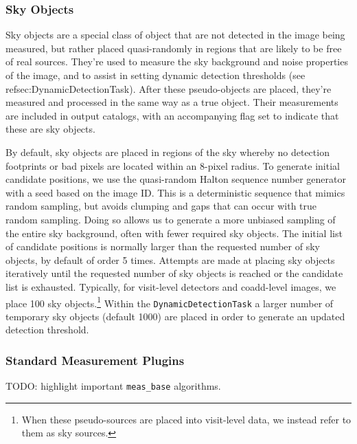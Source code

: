 \subsubsection{Sky Objects}
\label{sec:sky-objects}

Sky objects are a special class of object that are not detected in the image being measured, but rather placed quasi-randomly in regions that are likely to be free of real sources.
They're used to measure the sky background and noise properties of the image, and to assist in setting dynamic detection thresholds (see ref{sec:DynamicDetectionTask}).
After these pseudo-objects are placed, they're measured and processed in the same way as a true object.
Their measurements are included in output catalogs, with an accompanying flag set to indicate that these are sky objects.

By default, sky objects are placed in regions of the sky whereby no detection footprints or bad pixels are located within an 8-pixel radius.
To generate initial candidate positions, we use the quasi-random Halton sequence number generator with a seed based on the image ID.
This is a deterministic sequence that mimics random sampling, but avoids clumping and gaps that can occur with true random sampling.
Doing so allows us to generate a more unbiased sampling of the entire sky background, often with fewer required sky objects.
The initial list of candidate positions is normally larger than the requested number of sky objects, by default of order 5 times.
Attempts are made at placing sky objects iteratively until the requested number of sky objects is reached or the candidate list is exhausted.
Typically, for visit-level detectors and coadd-level images, we place 100 sky objects.\footnote{When these pseudo-sources are placed into visit-level data, we instead refer to them as sky sources.}
Within the \texttt{DynamicDetectionTask} a larger number of temporary sky objects (default 1000) are placed in order to generate an updated detection threshold.

\subsubsection{Standard Measurement Plugins}

TODO: highlight important \texttt{meas\_base} algorithms.







